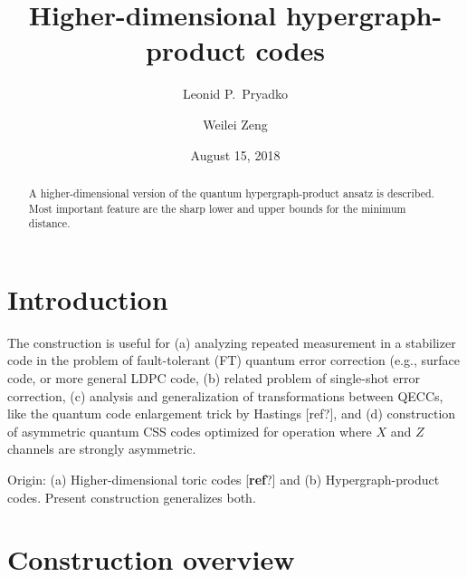 \documentclass[aps,prb,12pt,tightenlines,%
notitlepage,longbibliography]{revtex4-1}
\begin{document}
\title{Higher-dimensional hypergraph-product codes}
\date{August 15, 2018} \author{Leonid P.\ Pryadko}
\address{UCR}
\author{Weilei Zeng}
\address{UCR}
\begin{abstract}
  A higher-dimensional version of the quantum hypergraph-product
  ansatz is described.  Most important feature are the sharp lower and
  upper bounds for the minimum distance.
\end{abstract}
\maketitle

\section{Introduction}

The construction is useful for (a) analyzing repeated measurement in a
stabilizer code in the problem of fault-tolerant (FT) quantum error
correction (e.g., surface
code\cite{Dennis-Kitaev-Landahl-Preskill-2002}, or more general LDPC
code\cite{Kovalev-Pryadko-FT-2013}, (b) related problem of single-shot
error correction\cite{Campbell-2018}, (c) analysis and generalization
of transformations between QECCs, like the quantum code enlargement
trick by Hastings [ref?], and (d) construction of asymmetric quantum
CSS codes optimized for operation where $X$ and $Z$ channels are
strongly asymmetric\cite{Ioffe-Mezard-2007,Evans-2007,Stephens-2008,%
  Aliferis-Preskill-2008,sarvepalli-2009,Tuckett-Bartlett-Flammia-2018}.

Origin: (a) Higher-dimensional toric codes [\textbf{ref}?] and (b)
Hypergraph-product codes\cite{Tillich-Zemor-2009}.  Present
construction generalizes both.

\section{Construction overview}
\end{document}
